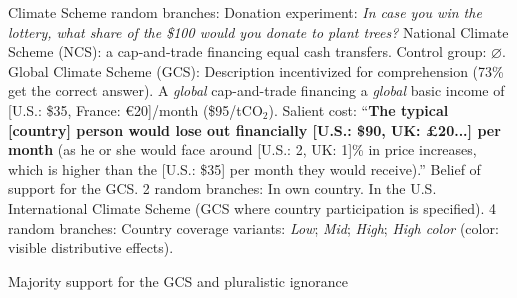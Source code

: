 \documentclass[aspectratio=169,xcolor=dvipsnames, 11pt,mathserif]{beamer}
\begin{document}
\begin{frame}{Climate Scheme\label{cs}} 
    \bbvsp {} random branches:
      \bbvsp \ip Donation experiment: \textit{In case you win the lottery, what share of the \$100 would you donate to plant trees?}
      \ip National Climate Scheme (NCS): a cap-and-trade financing equal cash transfers.
      \ip Control group: $\varnothing$. \ee
    \ip Global Climate Scheme (GCS): \hyperlink{gcs_question}{} 
      \bbvsp \ip Description incentivized for comprehension (73\% get the correct answer). %
      \ip A \textit{global} cap-and-trade financing a \textit{global} basic income of [U.S.: \$35, France: \euro{}20]/month (\$95/tCO$_\text{2}$).
      \ip Salient cost: ``\textbf{The typical [country] person would lose out financially [U.S.: \$90, UK: £20...] per month} (as he or she would face around [U.S.: 2, UK: 1]\% in price increases, which is higher than the [U.S.: \$35] per month they would receive).'' \ee
    \ip Belief of support for the GCS. 2 random branches:
      \bbvs \ip In own country.
      \ip In the U.S. \ee
    \ip International Climate Scheme (GCS where country participation is specified). 4 random branches:
    \bbvs \ip  Country coverage variants: \textit{Low}; \textit{Mid}; \textit{High}; \textit{High color} (color: visible distributive effects). \ee
    \ee
\end{frame}

\begin{frame}{Majority support for the GCS and pluralistic ignorance\label{gcs} \hyperlink{determinants}{}}
\end{frame}
\end{document}
